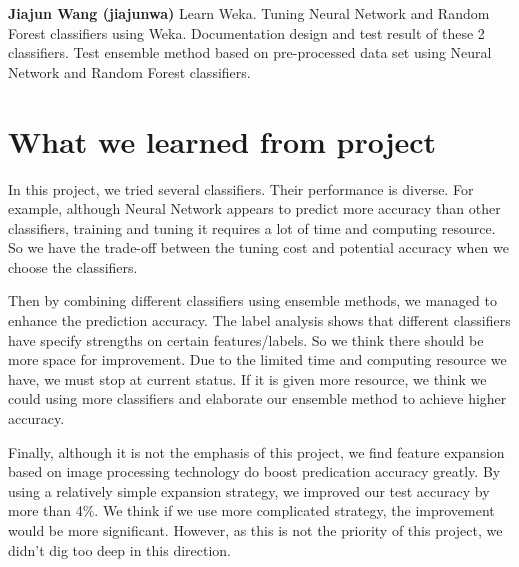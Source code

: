 \documentclass{acm_proc_article-sp}
\begin{document}
\textbf{Jiajun Wang (jiajunwa)}
Learn Weka. Tuning Neural Network and Random Forest classifiers using Weka.
Documentation design and test result of these 2 classifiers.
Test ensemble method based on pre-processed data set using Neural Network and Random Forest classifiers.

\section{What we learned from project}
In this project, we tried several classifiers. Their performance is diverse. For example, although Neural Network appears to predict more accuracy than other classifiers, training and tuning it requires a lot of time and computing resource. So we have the trade-off between the tuning cost and potential accuracy when we choose the classifiers.

Then by combining different classifiers using ensemble methods, we managed to enhance the prediction accuracy. The label analysis shows that different classifiers have specify strengths on certain features/labels. So we think there should be more space for improvement. Due to the limited time and computing resource we have, we must stop at current status. If it is given more resource, we think we could using more classifiers and elaborate our ensemble method to achieve higher accuracy.

Finally, although it is not the emphasis of this project, we find feature expansion based on image processing technology do boost predication accuracy greatly. By using a relatively simple expansion strategy, we improved our test accuracy by more than 4\%. We think if we use more complicated strategy, the improvement would be more significant. However, as this is not the priority of this project, we didn't dig too deep in this direction.
\end{document}
